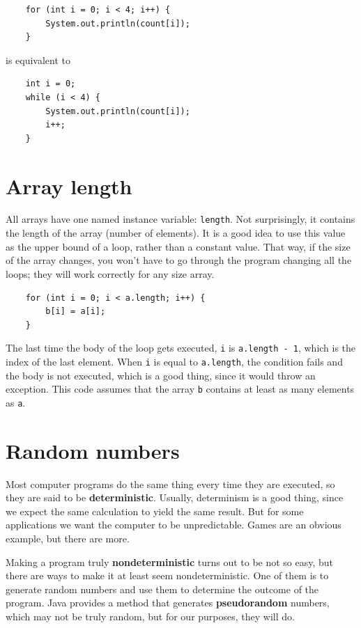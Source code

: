 \documentclass[12pt]{book}
\theoremstyle{exercise}
\begin{document}
\begin{lstlisting}
    for (int i = 0; i < 4; i++) {
        System.out.println(count[i]);
    }
\end{lstlisting}
%
is equivalent to

\begin{lstlisting}
    int i = 0;
    while (i < 4) {
        System.out.println(count[i]);
        i++;
    }
\end{lstlisting}


\section{Array length}

All arrays have one named instance variable: {\tt length}.
Not surprisingly, it contains the length of the array (number
of elements).  It is a good idea to use this value as the upper
bound of a loop, rather than a constant value.  That way, if
the size of the array changes, you won't have to go through the
program changing all the loops; they will work correctly for any
size array.

\begin{lstlisting}
    for (int i = 0; i < a.length; i++) {
        b[i] = a[i];
    }
\end{lstlisting}
%
The last time the body of the loop gets executed, {\tt i}
is {\tt a.length - 1}, which is the index of the last element.  When
{\tt i} is equal to {\tt a.length}, the condition fails and the body
is not executed, which is a good thing, since it would throw an
exception.  This code assumes that the array {\tt b} contains at least
as many elements as {\tt a}.


\section{Random numbers}
\label{random}
\label{pseudorandom}

Most computer programs do the same thing every time they are executed,
so they are said to be {\bf deterministic}.  Usually, determinism is a
good thing, since we expect the same calculation to yield the same
result.  But for some applications we want the
computer to be unpredictable.  Games are an obvious example, but
there are more.

Making a program truly {\bf nondeterministic} turns out to be not so
easy, but there are ways to make it at least seem nondeterministic.
One of them is to generate random numbers and use them to determine
the outcome of the program.  Java provides a method that generates
{\bf pseudorandom} numbers, which may not be truly random, but for our
purposes, they will do.
\end{document}
